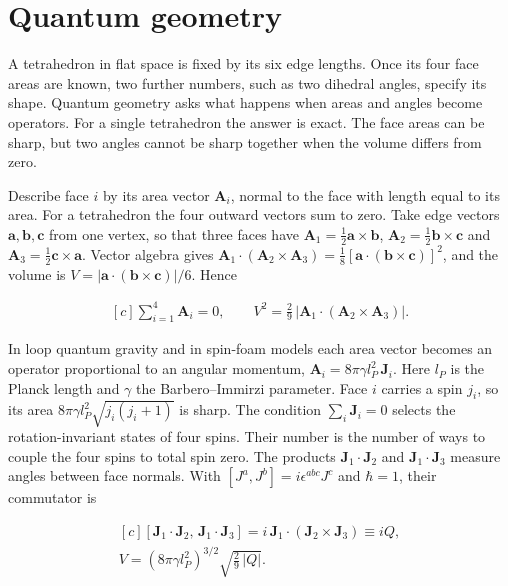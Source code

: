 \documentclass[11pt,oneside]{book}
\newenvironment{centeredalign}{\[\begin{gathered}[c]}{\end{gathered}\]}
\begin{document}
\clearpage

\section{Quantum geometry}

\label{topic:quantum-geometry}

A tetrahedron in flat space is fixed by its six edge lengths. Once its four face areas are known, two further numbers, such as two dihedral angles, specify its shape. Quantum geometry asks what happens when areas and angles become operators. For a single tetrahedron the answer is exact. The face areas can be sharp, but two angles cannot be sharp together when the volume differs from zero.

Describe face \(i\) by its area vector \(\mathbf A_i\), normal to the face with length equal to its area. For a tetrahedron the four outward vectors sum to zero. Take edge vectors \(\mathbf a,\mathbf b,\mathbf c\) from one vertex, so that three faces have \(\mathbf A_1=\frac12\mathbf a\times\mathbf b\), \(\mathbf A_2=\frac12\mathbf b\times\mathbf c\) and \(\mathbf A_3=\frac12\mathbf c\times\mathbf a\). Vector algebra gives \(\mathbf A_1\cdot(\mathbf A_2\times\mathbf A_3)=\frac18[\mathbf a\cdot(\mathbf b\times\mathbf c)]^2\), and the volume is \(V=|\mathbf a\cdot(\mathbf b\times\mathbf c)|/6\). Hence

\begin{centeredalign}
\sum_{i=1}^4\mathbf A_i=0,\qquad
V^2=\frac29\,\big|\mathbf A_1\cdot(\mathbf A_2\times\mathbf A_3)\big|.
\end{centeredalign}

In loop quantum gravity and in spin-foam models each area vector becomes an operator proportional to an angular momentum, \(\mathbf A_i=8\pi\gamma l_P^2\,\mathbf J_i\). Here \(l_P\) is the Planck length and \(\gamma\) the Barbero--Immirzi parameter. Face \(i\) carries a spin \(j_i\), so its area \(8\pi\gamma l_P^2\sqrt{j_i(j_i+1)}\) is sharp. The condition \(\sum_i\mathbf J_i=0\) selects the rotation-invariant states of four spins. Their number is the number of ways to couple the four spins to total spin zero. The products \(\mathbf J_1\cdot\mathbf J_2\) and \(\mathbf J_1\cdot\mathbf J_3\) measure angles between face normals. With \([J^a,J^b]=i\epsilon^{abc}J^c\) and \(\hbar=1\), their commutator is

\begin{centeredalign}
[\mathbf J_1\cdot\mathbf J_2,\,\mathbf J_1\cdot\mathbf J_3]=i\,\mathbf J_1\cdot(\mathbf J_2\times\mathbf J_3)\equiv iQ,\\
V=(8\pi\gamma l_P^2)^{3/2}\sqrt{\tfrac29\,|Q|}.
\end{centeredalign}
\end{document}
